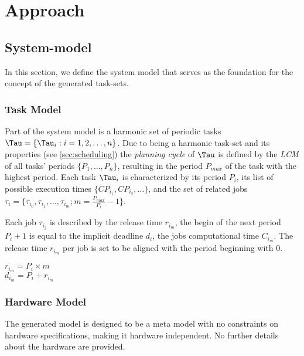 \chapter{Approach}
\section{System-model}\label{sec:model}
In this section, we define the system model that serves as the foundation for the concept of the generated task-sets.

\subsection{Task Model}\label{sec:task_model}
Part of the system model is a harmonic set of periodic tasks $\Tau=\{\Tau_i: i = 1, 2, \ldots, n\}$.
Due to being a harmonic task-set and its properties (see \cref{sec:scheduling}) the \textit{planning cycle}\cite{dar-tzenpengAssignmentSchedulingCommunicating1997} of $\Tau$ is defined by the \textit{\ac{LCM}} of all tasks' periods $\{P_1, \ldots, P_n\}$, resulting in the period $P_{max}$ of the task with the highest period.
Each task $\Tau_i$ is characterized by its period $P_i$, its list of possible execution times $\{CP_{i_1}, CP_{i_2}, \ldots\}$, and the set of related jobs $\tau_i=\{\tau_{i_0}, \tau_{i_1}, \dots, \tau_{i_m}; m = \frac{P_{max}}{P_i} - 1\}$.

Each job $\tau_{i_j}$ is described by the release time $r_{i_m}$, the begin of the next period $P_i+1$ is equal to the implicit deadline $d_i$, the jobs computational time $C_{i_m}$.
The release time $r_{i_m}$ per job is set to be aligned with the period beginning with $0$.
\begin{center}
	$r_{i_m} = P_i \times m$ \\
	$d_{i_m} = P_i + r_{i_m}$
\end{center}

\subsection{Hardware Model}\label{sec:hardware_model}
The generated model is designed to be a meta model with no constraints on hardware specifications, making it hardware independent.
No further details about the hardware are provided.

